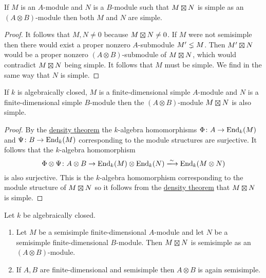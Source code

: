 \begin{lemma}
  \label{lemma: if product is simple then so are factors}
  If $M$ is an $A$-module and $N$ is a $B$-module such that $M \outertensor N$ is simple as an $(A \otimes B)$-module then both $M$ and $N$ are simple.
\end{lemma}


\begin{proof}
  It follows that $M, N \neq 0$ because $M \outertensor N \neq 0$.
  If $M$ were not semisimple then there would exist a proper nonzero $A$-submodule $M' \lneq M$.
  Then $M' \outertensor N$ would be a proper nonzero $(A \otimes B)$-submodule of $M \outertensor N$, which would contradict $M \outertensor N$ being simple.
  It follows that $M$ must be simple.
  We find in the same way that $N$ is simple.
\end{proof}


\begin{lemma}
  \label{lemma: tensor product of modules is again simple}
  If $k$ is algebraically closed, $M$ is a finite-dimensional simple $A$-module and $N$ is a finite-dimensional simple $B$-module then the $(A \otimes B)$-module $M \outertensor N$ is also simple.
\end{lemma}


\begin{proof}
  By the \hyperref[theorem: density theorem]{density theorem} the $k$-algebra homomorphisms $\Phi \colon A \to \operatorname{End}_k(M)$ and $\Psi \colon B \to \operatorname{End}_k(M)$ corresponding to the module structures are surjective.
  It follows that the $k$-algebra homomorphism
  \[
                            \Phi \otimes \Psi
    \colon                  A \otimes B
    \to                     \End_k(M) \otimes \End_k(N)
    \xlongrightarrow{\sim}  \End_k(M \otimes N)
  \]
  is also surjective.
  This is the $k$-algebra homomorphism corresponding to the module structure of $M \outertensor N$ so it follows from the \hyperref[theorem: density theorem]{density theorem} that $M \outertensor N$ is simple.
\end{proof}




\begin{corollary}
  Let $k$ be algebraically closed.
  \begin{enumerate}
    \item
      \label{enumerate: outer tensor product of semisimple modules}
      Let $M$ be a semisimple finite-dimensional $A$-module and let $N$ be a semisimple finite-dimensional $B$-module.
      Then $M \outertensor N$ is semisimple as an $(A \otimes B)$-module.
    \item
      If $A, B$ are finite-dimensional and semisimple then $A \otimes B$ is again semisimple.
  \end{enumerate}
\end{corollary}


